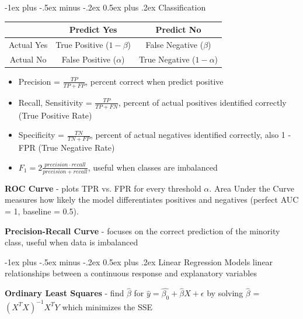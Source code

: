 \documentclass[10pt,landscape]{article}
\makeatletter
\renewcommand{\section}{\@startsection{section}{1}{0mm}%
                                {-1ex plus -.5ex minus -.2ex}%
                                {0.5ex plus .2ex}%
                                {\normalfont\large\bfseries}}
\renewcommand{\subsection}{\@startsection{subsection}{2}{0mm}%
                                {-1ex plus -.5ex minus -.2ex}%
                                {0.5ex plus .2ex}%
                                {\normalfont\normalsize\bfseries}}
\makeatother
\begin{document}
\begin{multicols}{3}
\subsection{Classification}
\begin{center}
        \footnotesize
        \begin{tabular}{ |c|c|c| }
         \hline
          & Predict Yes & Predict No \\
         \hline
         Actual Yes & True Positive ($1-\beta$) & False Negative ($\beta$)  \\
         Actual No & False Positive ($\alpha$) & True Negative ($1-\alpha$) \\
         \hline
        \end{tabular}
        \end{center}
\vspace{-1mm}
\begin{itemize}[label={--},leftmargin=4mm]
    \vspace{-1mm}
    \itemsep -.4mm
    \item Precision = $\frac{TP}{TP + FP}$, percent correct when predict positive
    \item Recall, Sensitivity = $\frac{TP}{TP + FN}$, percent of actual positives identified correctly (True Positive Rate)
    \item Specificity = $\frac{TN}{TN + FP}$, percent of actual negatives identified correctly, also 1 - FPR (True Negative Rate)
    \item $F_1 = 2\frac{precision\cdot recall}{precision + recall}$, useful when classes are imbalanced
\end{itemize}


\textbf{ROC Curve} - plots TPR vs. FPR for every threshold $\alpha$. Area Under the Curve  measures how likely the model differentiates positives and negatives (perfect AUC = 1, baseline = 0.5).

\textbf{Precision-Recall Curve} - focuses on the correct prediction of the minority class, useful when data is imbalanced

\section{Linear Regression}
Models linear relationships between a continuous response and explanatory variables

\textbf{Ordinary Least Squares} - find $\hat{\beta}$ for $\hat{y} = \hat{\beta_{0}} + \hat{\beta}X + \epsilon$
by solving $\hat{\beta}$ = $(X^{T}X)^{-1}X^{T}Y$ which minimizes the SSE


\end{multicols}
\end{document}
